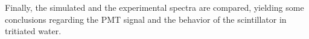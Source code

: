 Finally, the simulated and the experimental spectra are compared, yielding some conclusions regarding the PMT signal and the behavior of the scintillator in tritiated water.